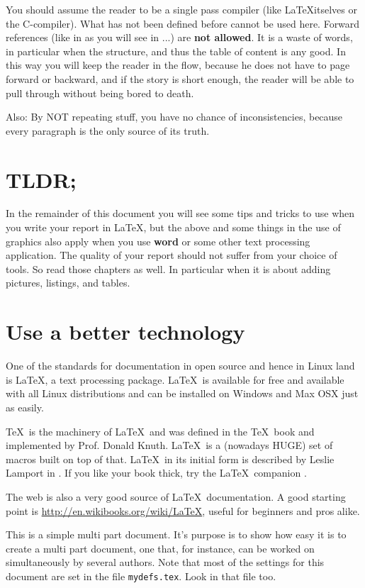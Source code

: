 You should assume the reader to be a single pass compiler (like \LaTeX itselves or the C-compiler). What has not been defined before cannot be used here. Forward references (like in as you will see in ...) are \textbf{not allowed}. It is a waste of words, in particular when the structure, and thus the table of content is any good.
In this way you will keep the reader in the flow, because he does not have to page forward or backward, and if the story is short enough, the reader will be able to pull through without being bored to death.

Also: By NOT repeating stuff, you have no chance of inconsistencies, because every paragraph is the only source of its truth.

\section{TLDR;}

In the remainder of this document you will see some tips and tricks to use when you write your report in \LaTeX,
but the above and some things in the use of graphics also apply when you use \textbf{word} or some other text processing application. The quality of your report should not suffer from your choice of tools.
So read those chapters as well. In particular when it is about adding pictures, listings, and tables.

\section{Use a better technology}
One of the standards for documentation in open source and hence in
Linux land is \LaTeX, a text processing package. \LaTeX\ is available
for free and available with all Linux distributions and can be installed on Windows and Max OSX just as easily.

\TeX\ is the machinery of \LaTeX\ and was defined in the \TeX\ book
\cite{texbook} and implemented by
Prof. Donald Knuth. \LaTeX\ is a (nowadays HUGE) set of macros built
on top of that. \LaTeX\ in its initial form is described by Leslie
Lamport in \cite{latexbook}. If you like your book thick, try the
\LaTeX\ companion \cite{latexcompanion}.

The web is also a very good source of \LaTeX\ documentation. A good
starting point is \url{http://en.wikibooks.org/wiki/LaTeX}, useful for
beginners and pros alike.

This is a simple multi part document. It's purpose is to show how easy it is
to create a multi part document, one that, for instance, can be worked on 
simultaneously by several authors. Note that most of the settings for
this document are set in the file \texttt{mydefs.tex}. 
Look in that file too.

